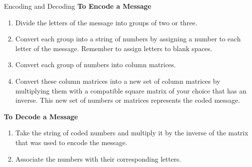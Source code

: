 \begin{summarybox}{Encoding and Decoding}
    \textbf{To Encode a Message}
    \begin{enumerate}
        \item Divide the letters of the message into groups of two or three.
        \item Convert each group into a string of numbers by assigning a number to each letter of the message. Remember to assign letters to blank spaces.
        \item Convert each group of numbers into column matrices.
        \item Convert these column matrices into a new set of column matrices by multiplying them with a compatible square matrix of your choice that has an inverse. This new set of numbers or matrices represents the coded message.
    \end{enumerate}

    \textbf{To Decode a Message}
    \begin{enumerate}
        \item Take the string of coded numbers and multiply it by the inverse of the matrix that was used to encode the message.
        \item Associate the numbers with their corresponding letters.
    \end{enumerate}
\end{summarybox}
